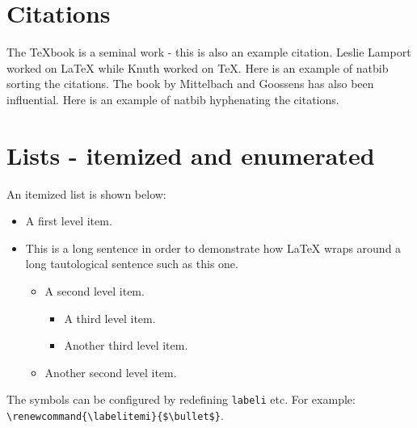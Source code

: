 \documentclass{article}
\begin{document}
\cleardoublepage

\section{Citations}
The TeXbook\cite{Knuth84} is a seminal work - this is also an example citation.  Leslie Lamport worked on LaTeX
while Knuth worked on TeX.  Here is an example of natbib sorting the citations\cite{Lamp86,Knuth84}.
The book by Mittelbach and Goossens\cite{Mitt04} has also been influential.
Here is an example of natbib hyphenating the citations\cite{Knuth84,Lamp86,Mitt04}.

\cleardoublepage




\cleardoublepage

\appendix
\section{Lists - itemized and enumerated}

An itemized list is shown below:
\begin{itemize}
    \item A first level item.
    \item This is a long sentence in order to demonstrate how LaTeX wraps around a long
    tautological sentence such as this one.
    \begin{itemize}
        \item A second level item.
        \begin{itemize}
            \item A third level item.
            \item Another third level item.
        \end{itemize}
        \item Another second level item.
    \end{itemize}
\end{itemize}

The symbols can be configured by redefining \texttt{labeli} etc.
For example:\\
\texttt{\textbackslash renewcommand\{\textbackslash labelitemi\}\{\$\textbackslash bullet\$\}}.
\end{document}
